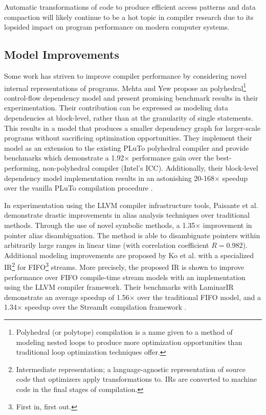 \documentclass[nobib]{tufte-handout}
\begin{document}
Automatic transformations of code to produce efficient access patterns and data compaction will likely continue to be a hot topic in compiler research due to its lopsided impact on program performance on modern computer systems.


\subsection{Model Improvements}
Some work has striven to improve compiler performance by considering novel internal representations of programs.  Mehta and Yew propose an polyhedral\footnote{Polyhedral (or polytope) compilation is a name given to a method of modeling nested loops to produce more optimization opportunities than traditional loop optimization techniques offer.} control-flow dependency model and present promising benchmark results in their experimentation.  Their contribution can be expressed as modeling data dependencies at block-level, rather than at the granularity of single statements.  This results in a model that produces a smaller dependency graph for larger-scale programs without sacrificing optimization opportunities.  They implement their model as an extension to the existing PLuTo polyhedral compiler and provide benchmarks which demonstrate a 1.92$\times$ performance gain over the best-performing, non-polyhedral compiler (Intel's ICC).  Additionally, their block-level dependency model implementation results in an astonishing 20-168$\times$ speedup over the vanilla PLuTo compilation procedure \cite{Mehta}.

In experimentation using the LLVM compiler infrastructure tools, Paisante et al. demonstrate drastic improvements in alias analysis techniques over traditional methods.  Through the use of novel symbolic methods, a 1.35$\times$ improvement in pointer alias disambiguation.  The method is able to disambiguate pointers within arbitrarily large ranges in linear time (with correlation coefficient $R = 0.982$).  Additional modeling improvements are proposed by Ko et al. with a specialized IR\footnote{Intermediate representation; a language-agnostic representation of source code that optimizers apply transformations to.  IRs are converted to machine code in the final stages of compilation.} for FIFO\footnote{First in, first out.} streams.  More precisely, the proposed IR is shown to improve performance over FIFO compile-time stream models with an implementation using the LLVM compiler framework.  Their benchmarks with LaminarIR demonstrate an average speedup of 1.56$\times$ over the traditional FIFO model, and a 1.34$\times$ speedup over the StreamIt compilation framework \cite{Ko}.
\end{document}
